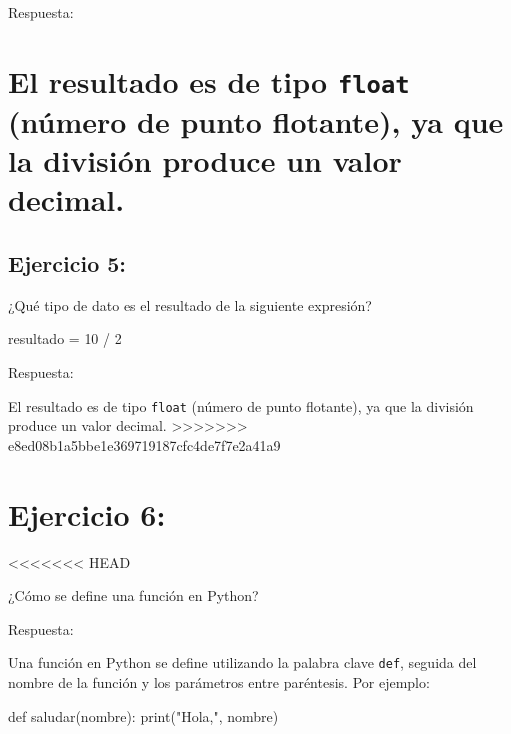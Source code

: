 \documentclass[
  a4paper,
  DIV=11,
  numbers=noendperiod,
  onepage,
  openany]{scrreprt}
\newenvironment{Shaded}{\begin{snugshade}}{\end{snugshade}}
\newcommand{\BuiltInTok}[1]{\textcolor[rgb]{0.00,0.23,0.31}{#1}}
\newcommand{\DecValTok}[1]{\textcolor[rgb]{0.68,0.00,0.00}{#1}}
\newcommand{\KeywordTok}[1]{\textcolor[rgb]{0.00,0.23,0.31}{#1}}
\newcommand{\NormalTok}[1]{\textcolor[rgb]{0.00,0.23,0.31}{#1}}
\newcommand{\OperatorTok}[1]{\textcolor[rgb]{0.37,0.37,0.37}{#1}}
\newcommand{\StringTok}[1]{\textcolor[rgb]{0.13,0.47,0.30}{#1}}
\begin{document}
Respuesta:

\hypertarget{el-resultado-es-de-tipo-float-nuxfamero-de-punto-flotante-ya-que-la-divisiuxf3n-produce-un-valor-decimal.}{%
\chapter{\texorpdfstring{El resultado es de tipo \texttt{float} (número
de punto flotante), ya que la división produce un valor
decimal.}{El resultado es de tipo float (número de punto flotante), ya que la división produce un valor decimal.}}\label{el-resultado-es-de-tipo-float-nuxfamero-de-punto-flotante-ya-que-la-divisiuxf3n-produce-un-valor-decimal.}}

\hypertarget{ejercicio-5-1}{%
\section{Ejercicio 5:}\label{ejercicio-5-1}}

¿Qué tipo de dato es el resultado de la siguiente expresión?

\begin{Shaded}
\begin{Highlighting}[]
\NormalTok{resultado }\OperatorTok{=} \DecValTok{10} \OperatorTok{/} \DecValTok{2}
\end{Highlighting}
\end{Shaded}

Respuesta:

El resultado es de tipo \texttt{float} (número de punto flotante), ya
que la división produce un valor decimal.
\textgreater\textgreater\textgreater\textgreater\textgreater\textgreater\textgreater{}
e8ed08b1a5bbe1e369719187cfc4de7f7e2a41a9

\hypertarget{ejercicio-6}{%
\chapter{Ejercicio 6:}\label{ejercicio-6}}

\textless\textless\textless\textless\textless\textless\textless{} HEAD

¿Cómo se define una función en Python?

Respuesta:

Una función en Python se define utilizando la palabra clave
\texttt{def}, seguida del nombre de la función y los parámetros entre
paréntesis. Por ejemplo:

\begin{Shaded}
\begin{Highlighting}[]
\KeywordTok{def}\NormalTok{ saludar(nombre):}
    \BuiltInTok{print}\NormalTok{(}\StringTok{"Hola,"}\NormalTok{, nombre)}
\end{Highlighting}
\end{Shaded}
\end{document}
